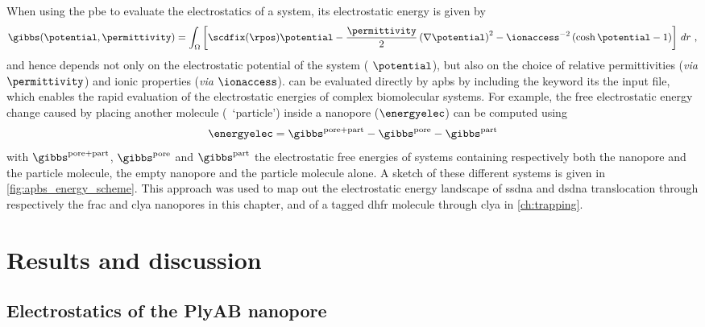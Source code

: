 When using the \gls{pbe} to evaluate the electrostatics of a system, its electrostatic energy is given
by~\cite{Baker-2005}
%
\begin{equation}\label{eq:pbe_energy}
  \gibbs (\potential, \permittivity) = \int_\Omega \left[
    \scdfix(\rpos) \potential
    - \dfrac{\permittivity}{2}\left( \nabla \potential \right)^2
    - \ionaccess^{-2} \left( \cosh \potential - 1 \right)
  \right] \,dr
  \text{ ,}
\end{equation}
%
and hence depends not only on the electrostatic potential of the system ( $\potential$), but also on
the choice of relative permittivities (\textit{via} $\permittivity$) and ionic properties (\textit{via}
$\ionaccess$).  can be evaluated directly by \gls{apbs} by including the 
keyword its the input file, which enables the rapid evaluation of the electrostatic energies of complex
biomolecular systems. For example, the free electrostatic energy change caused by placing another molecule
(\ie~`particle') inside a nanopore ($\energyelec$) can be computed using~\cite{Homeyer-2015}
%
\begin{equation}\label{eq:electrostatic_energy}
  \energyelec = \gibbs^{\rm{pore+part}} - \gibbs^{\rm{pore}} - \gibbs^{\rm{part}}
\end{equation}
%
with $\gibbs^{\rm{pore+part}}$, $\gibbs^{\rm{pore}}$ and $\gibbs^{\rm{part}}$ the electrostatic free energies
of systems containing respectively both the nanopore and the particle molecule, the empty nanopore and the
particle molecule alone. A sketch of these different systems is given in \cref{fig:apbs_energy_scheme}. This
approach was used to map out the electrostatic energy landscape of \gls{ssdna} and \gls{dsdna} translocation
through respectively the \gls{frac} and \gls{clya} nanopores in this chapter, and of a tagged \gls{dhfr}
molecule through \gls{clya} in \cref{ch:trapping}.



%
\clearpage
%


\section{Results and discussion}
%
\label{sec:elec:results}
%


\subsection{Electrostatics of the PlyAB nanopore}
%
\label{sec:elec:plyab}
%

